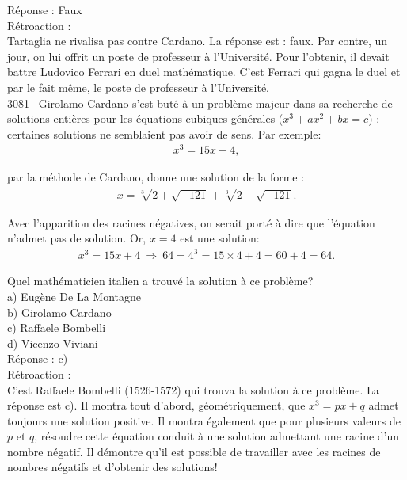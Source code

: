 \documentclass[letterpaper, 12pt]{article}
\begin{document}
R\'eponse : Faux\\

R\'etroaction :\\
Tartaglia ne rivalisa pas contre Cardano. La r\'eponse est : faux. Par contre, un jour, on lui offrit un poste de professeur \`a l'Universit\'e. Pour l'obtenir, il devait battre Ludovico Ferrari en duel math\'ematique. C'est Ferrari qui gagna le duel et par le fait m\^eme, le poste de professeur \`a l'Universit\'e.\\



3081-- Girolamo Cardano s'est but\'e \`a un probl\`eme majeur dans sa recherche de solutions enti\`eres pour les \'equations cubiques g\'en\'erales ($x^{3} + ax^{2} + bx = c$) : certaines solutions ne semblaient pas avoir de sens. Par exemple:
\begin{eqnarray*}
x^{3} = 15x + 4,
\end{eqnarray*}

par la m\'ethode de Cardano, donne une solution de la forme :
\begin{eqnarray*}
x = \sqrt[3]{2 + \sqrt{-121}} + \sqrt[3]{2 - \sqrt{-121}}.
\end{eqnarray*}

Avec l'apparition des racines n\'egatives, on serait port\'e \`a dire que l'\'equation n'admet pas de solution. Or, $x = 4$ est une solution:
\begin{eqnarray*}
x^{3} = 15x + 4 \ \Rightarrow \ 64 = 4^{3} = 15 \times 4 + 4 = 60 + 4 = 64.
\end{eqnarray*}

Quel math\'ematicien italien a trouv\'e la solution \`a ce probl\`eme?\\

a) Eug\`ene De La Montagne\\
b) Girolamo Cardano\\
c) Raffaele Bombelli\\
d) Vicenzo Viviani\\

R\'eponse : c)\\

R\'etroaction :\\
C'est Raffaele Bombelli (1526-1572) qui trouva la solution \`a ce probl\`eme. La r\'eponse est c). Il montra tout d'abord, g\'eom\'etriquement, que $x^{3} = px + q$ admet toujours une solution positive. Il montra \'egalement que pour plusieurs valeurs de $p$ et $q$, r\'esoudre cette \'equation conduit \`a une solution admettant une racine d'un nombre n\'egatif. Il d\'emontre qu'il est possible de travailler avec les racines de nombres n\'egatifs et d'obtenir des solutions!\\
\end{document}
